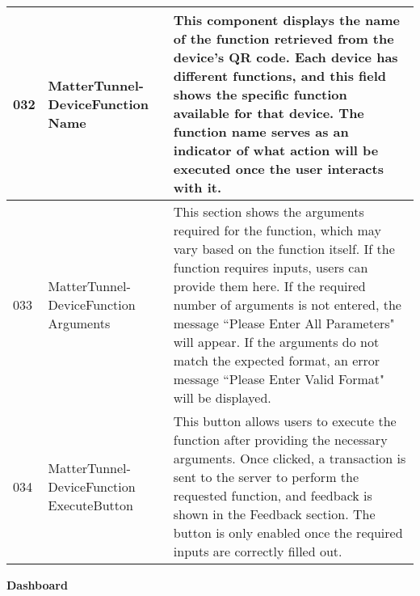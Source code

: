 \documentclass[conference]{IEEEtran}
\begin{document}
\begin{enumerate}[itemsep=2ex, parsep=1ex]
\begin{enumerate}[itemsep=2ex, parsep=1ex]
	      	      \begin{table}[h!]
	      	      	\def\arraystretch{1.24} \small
	      	      	\begin{tabular}{|p{1cm}|p{2.2cm}|p{4.5cm}|}
	      	      		\hline
	      	      		032 & MatterTunnel-DeviceFunction Name          & This component displays the name of the function retrieved from the device’s QR code. Each device has different functions, and this field shows the specific function available for that device. The function name serves as an indicator of what action will be executed once the user interacts with it.                                                                                           \\
	      	      		\hline
	      	      		033 & MatterTunnel-DeviceFunction Arguments     & This section shows the arguments required for the function, which may vary based on the function itself. If the function requires inputs, users can provide them here. If the required number of arguments is not entered, the message ``Please Enter All Parameters" will appear. If the arguments do not match the expected format, an error message ``Please Enter Valid Format" will be displayed. \\
	      	      		\hline
	      	      		034 & MatterTunnel-DeviceFunction ExecuteButton & This button allows users to execute the function after providing the necessary arguments. Once clicked, a transaction is sent to the server to perform the requested function, and feedback is shown in the Feedback section. The button is only enabled once the required inputs are correctly filled out.                                                                                            \\
	      	      		\hline
	      	      	\end{tabular}
	      	      \end{table}
	      \end{enumerate}
\end{enumerate}

\clearpage

{\centering \textbf{Dashboard} \par}
\end{document}
